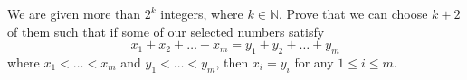 We are given more than $2^k$ integers, where $k\in\mathbb{N}$. Prove that we can choose $k+2$ of them such that if some of our selected numbers satisfy
\[x_1+x_2+\dots+x_m=y_1+y_2+\dots+y_m\]
where $x_1<\dots<x_m$ and $y_1<\dots<y_m$, then $x_i=y_i$ for any $1\le i\le m$.